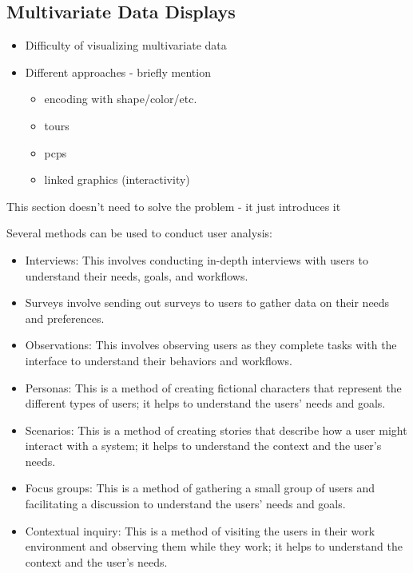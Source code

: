 \documentclass[print]{nuthesis}
\providecommand{\tightlist}{%
  \setlength{\itemsep}{0pt}\setlength{\parskip}{0pt}}
\begin{document}
\hypertarget{multivariate-data-displays}{%
\subsection{Multivariate Data Displays}\label{multivariate-data-displays}}

\begin{itemize}
\tightlist
\item
  Difficulty of visualizing multivariate data
\item
  Different approaches - briefly mention

  \begin{itemize}
  \tightlist
  \item
    encoding with shape/color/etc.
  \item
    tours
  \item
    pcps
  \item
    linked graphics (interactivity)
  \end{itemize}
\end{itemize}

This section doesn't need to solve the problem - it just introduces it

Several methods can be used to conduct user analysis:

\begin{itemize}
\tightlist
\item
  Interviews: This involves conducting in-depth interviews with users to understand their needs, goals, and workflows.
\item
  Surveys involve sending out surveys to users to gather data on their needs and preferences.
\item
  Observations: This involves observing users as they complete tasks with the interface to understand their behaviors and workflows.
\item
  Personas: This is a method of creating fictional characters that represent the different types of users; it helps to understand the users' needs and goals.
\item
  Scenarios: This is a method of creating stories that describe how a user might interact with a system; it helps to understand the context and the user's needs.
\item
  Focus groups: This is a method of gathering a small group of users and facilitating a discussion to understand the users' needs and goals.
\item
  Contextual inquiry: This is a method of visiting the users in their work environment and observing them while they work; it helps to understand the context and the user's needs.
\end{itemize}
\end{document}

